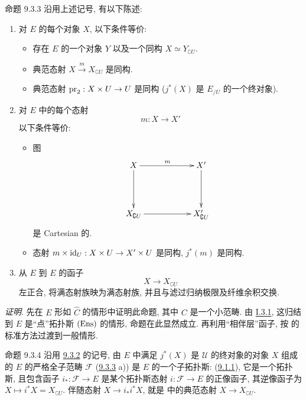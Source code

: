 \begin{enonce*}{命题 9.3.3}
沿用上述记号, 有以下陈述:
\begin{enumerate}
\renewcommand{\theenumi}{\alph{enumi}}
\renewcommand{\labelenumi}{\theenumi)}
\item 对 $E$ 的每个对象 $X$, 以下条件等价:
\begin{itemize}
\item[(i)] 存在 $E$ 的一个对象 $Y$ 以及一个同构 $X\simeq Y_{\complement U}$.

\item[(ii)] 典范态射 $X\xrightarrow{m}X_{\complement U}$ 是同构.

\item[(iii)] 典范态射 $\operatorname{pr}_2:X\times U\rightarrow U$ 是同构
(\ie $j^{\ast}(X)$ 是 $E_{/U}$ 的一个终对象).
\end{itemize}

\item 对 $E$ 中的每个态射
$$
m:X\longrightarrow X'
$$
以下条件等价:
\begin{itemize}
\item[${\rm (i')}$] 图
\[
\xymatrix@C=2cm@R=1.5cm{
X \ar[r]^{m} \ar[d]& X'\ar[d]\\
X_{\complement U} \ar[r]& X'_{\complement U} }
\]
是 Cartesian 的.

\item[${\rm (ii')}$] 态射 $m\times\operatorname{id}_U:X\times U\rightarrow X'\times U$
是同构, \ie $j^{\ast}(m)$ 是同构.
\end{itemize}

\item 从 $E$ 到 $E$ 的函子
$$
X\longrightarrow X_{\complement U}
$$
左正合, 将满态射族映为满态射族,
并且与滤过归纳极限及\pageoriginale 纤维余积交换.
\end{enumerate}
\end{enonce*}

\noindent \emph{证明}.
先在 $E$ 形如 $\widehat{C}$ 的情形中证明此命题,
其中 $C$ 是一个小范畴.
由 \hyperref[I.prop3.1]{I.3.1},
这归结到 $E$ 是“点”拓扑斯 $(\operatorname{Ens})$ 的情形, 命题在此显然成立.
再利用“相伴层”函子,
按  的标准方法过渡到一般情形.

\begin{enonce*}{命题 9.3.4}
沿用 \hyperref[IV.subsubsec9.3.2]{9.3.2} 的记号,
由 $E$ 中满足 $j^{\ast}(X)$ 是 $\mathcal{U}$ 的终对象的对象 $X$
组成的 $E$ 的严格全子范畴 $\mathcal{F}$
\textup{(\cf \hyperref[IV.prop9.3.3]{9.3.3} a))}
是 $E$ 的一个子拓扑斯:
\ie (\hyperref[IV.def9.1.1]{9.1.1}),
它是一个拓扑斯, 且包含函子 $i_{\ast}:\mathcal{F}\rightarrow E$
是某个拓扑斯态射 $i:\mathcal{F}\rightarrow E$ 的正像函子,
其逆像函子为 $X\mapsto i^{\ast}X=X_{\complement U}$.
伴随态射 $X\rightarrow i_{\ast}i^{\ast}X$,
就是  中的典范态射 $X\rightarrow X_{\complement U}$.
\end{enonce*}

